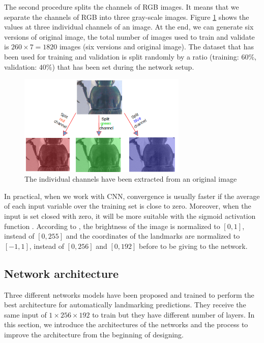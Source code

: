 \documentclass{article} %
\begin{document}
\begin{multicols}{2}
The second procedure splits the channels of RGB images. It means that we separate the channels of RGB into three gray-scale images. Figure \ref{figpronotum2} shows the values at three individual channels of an image. At the end, we can generate six versions of original image, the total number of images used to train and validate is $260 \times 7 = 1820$ images (six versions and original image). The dataset that has been used for training and validation is split randomly by a ratio (training: $60\%$, validation: $40\%$) that has been set during the network setup.

\begin{figure}[H]
	\centerline{\includegraphics[height=1.9in]{images/sp_channels.png}}
	\caption{\footnotesize{The individual channels have been extracted from an original image}}
	\label{figpronotum2}
\end{figure}

In practical, when we work with CNN, convergence is usually faster if the average of each input variable over the training set is close to zero. Moreover, when the input is set closed with zero, it will be more suitable with the sigmoid activation function \cite{lecun2012efficient}. According to \cite{lecun2012efficient}, the brightness of the image is normalized to $[0,1]$, instead of $[0,255]$ and the coordinates of the landmarks are normalized to $[-1,1]$, instead of $[0,256]$ and $[0,192]$ before to be giving to the network.
\subsection{Network architecture}
\label{SecArch}
Three different networks models have been proposed and trained to perform the best architecture for automatically landmarking predictions. They receive the same input of $1 \times 256 \times 192$ to train but they have different number of layers. In this section, we introduce the architectures of the networks and the process to improve the architecture from the beginning of designing.


\end{multicols}
\end{document}
